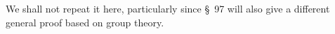 We shall not repeat it here, particularly since \S~97 will also give a different general proof based on group theory.
